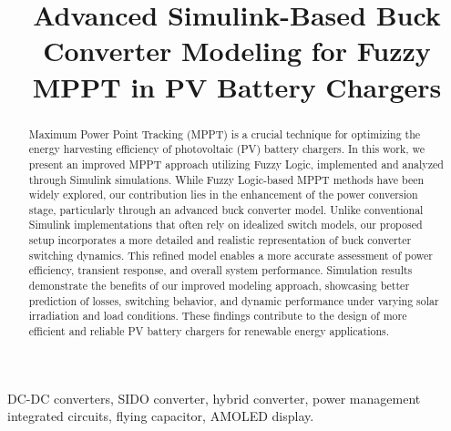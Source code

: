 \documentclass[conference,beamer]{IEEEtran}
\begin{document}
\title{Advanced Simulink-Based Buck Converter Modeling for Fuzzy MPPT in PV Battery Chargers}

\author{
}
\IEEEoverridecommandlockouts
\maketitle
\IEEEpubidadjcol

\begin{abstract}
Maximum Power Point Tracking (MPPT) is a crucial technique for optimizing the energy harvesting efficiency of photovoltaic (PV) battery chargers. In this work, we present an improved MPPT approach utilizing Fuzzy Logic, implemented and analyzed through Simulink simulations. While Fuzzy Logic-based MPPT methods have been widely explored, our contribution lies in the enhancement of the power conversion stage, particularly through an advanced buck converter model. Unlike conventional Simulink implementations that often rely on idealized switch models, our proposed setup incorporates a more detailed and realistic representation of buck converter switching dynamics. This refined model enables a more accurate assessment of power efficiency, transient response, and overall system performance. Simulation results demonstrate the benefits of our improved modeling approach, showcasing better prediction of losses, switching behavior, and dynamic performance under varying solar irradiation and load conditions. These findings contribute to the design of more efficient and reliable PV battery chargers for renewable energy applications.  
\end{abstract}


\begin{IEEEkeywords}
DC-DC converters, SIDO converter, hybrid converter, power management integrated circuits, flying capacitor, AMOLED display.
\end{IEEEkeywords}
\end{document}
